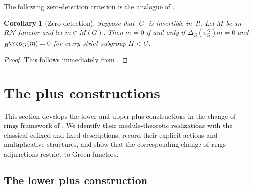 \documentclass{amsart}
\numberwithin{equation}{section}%
\newtheorem{Cor}[equation]{Corollary}
\theoremstyle{remark}
\theoremstyle{definition}
\newcommand{\n}{\mathcal N}
\newcommand{\lres}[1]{{}_{#1}\!\res}
\begin{document}
%
The following zero-detection criterion is the analogue of
\cite[Corollary~6.3]{Boltje98a}.
%
\begin{Cor}[Zero detection]
\label{cor:Burnside-zero-detection}
Suppose that $|G|$ is invertible in~$R$.  Let $M$ be an
$R\n$-functor and let $m\in M(G)$.  Then $m=0$ if and only if
$\Delta_G(e_G^G)m=0$ and ${}\lres{H}_G(m)=0$ for every strict
subgroup $H<G$.
\end{Cor}
%
\begin{proof}
This follows immediately from
.
\end{proof}



%
\section{The plus constructions}
\label{sec:plus-constructions}
%

This section develops the lower and upper plus constructions in the
change-of-rings framework of . We
identify their module-theoretic realizations with the classical
cofixed and fixed descriptions, record their explicit actions and
multiplicative structures, and show that the corresponding
change-of-rings adjunctions restrict to Green functors.
%


%
\subsection{The lower plus construction}\
\label{ssec:lower-plus-construction}
%
\end{document}
